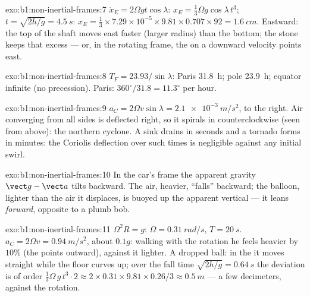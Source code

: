 \begin{solution}{exo:b1:non-inertial-frames:7}
$\ddot x_E = 2\Omega gt\cos\lambda$: $x_E = \tfrac13\Omega g\cos\lambda\,t^3$; $t =
\sqrt{2h/g} = \qty{4.5}{s}$: $x_E = \tfrac13 \times 7.29\times10^{-5} \times 9.81
\times 0.707 \times 92 = \qty{1.6}{cm}$. Eastward: the top of the shaft
moves east faster (larger radius) than the bottom; the stone keeps that
excess --- or, in the rotating frame, the  on a downward
velocity points east.
\end{solution}

\begin{solution}{exo:b1:non-inertial-frames:8}
$T_F = 23.93/\sin\lambda$: Paris \qty{31.8}{h}; pole \qty{23.9}{h}; equator
infinite (no precession). Paris: $360^\circ/31.8 = 11.3^\circ$ per hour.
\end{solution}

\begin{solution}{exo:b1:non-inertial-frames:9}
$a_C = 2\Omega v\sin\lambda = \qty{2.1e-3}{m/s^2}$, to the right. Air
converging from all sides is deflected right, so it spirals in
counterclockwise (seen from above): the northern cyclone. A sink drains
in seconds and a tornado forms in minutes: the Coriolis deflection over
such times is negligible against any initial swirl.
\end{solution}

\begin{solution}{exo:b1:non-inertial-frames:10}
In the car's frame the apparent gravity $\vect g - \vect a$ tilts backward.
The air, heavier, ``falls'' backward; the balloon, lighter than the air it
displaces, is buoyed up the apparent vertical --- it leans \emph{forward},
opposite to a plumb bob.
\end{solution}

\begin{solution}{exo:b1:non-inertial-frames:11}
$\Omega^2R = g$: $\Omega = \qty{0.31}{rad/s}$, $T = \qty{20}{s}$. $a_C = 2\Omega v
= \qty{0.94}{m/s^2}$, about $0.1g$: walking with the rotation he feels
heavier by $10\%$ (the  points outward), against it
lighter. A dropped ball: in the  it moves straight while
the floor curves up; over the fall time $\sqrt{2h/g} = \qty{0.64}{s}$ the
deviation is of order $\tfrac13\Omega\,g\,t^3 \cdot 2 \approx 2 \times 0.31 \times
9.81 \times 0.26/3 \approx \qty{0.5}{m}$ --- a few decimeters, against the
rotation.
\end{solution}

